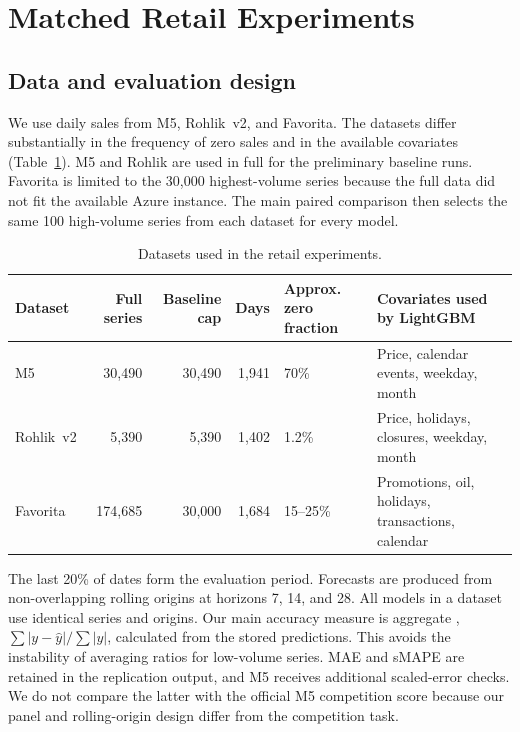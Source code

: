 \section{Matched Retail Experiments}
\label{sec:experiments}

\subsection{Data and evaluation design}
\label{sec:setup}\label{sec:experimental-setup}\label{sec:datasets}

We use daily sales from M5, Rohlik~v2, and Favorita. The datasets differ
substantially in the frequency of zero sales and in the available covariates
(Table~\ref{tab:t51}). M5 and Rohlik are used in full for the preliminary
baseline runs. Favorita is limited to the 30,000 highest-volume series because
the full data did not fit the available Azure instance. The main paired
comparison then selects the same 100 high-volume series from each dataset for
every model.

\begin{table}[htbp]
\centering
\caption{Datasets used in the retail experiments.}
\label{tab:t51}
\footnotesize
\begin{tabularx}{\textwidth}{lrrrlX}
\toprule
Dataset & Full series & Baseline cap & Days & Approx. zero fraction & Covariates used by LightGBM \\
\midrule
M5 & 30,490 & 30,490 & 1,941 & 70\% & Price, calendar events, weekday, month \\
Rohlik~v2 & 5,390 & 5,390 & 1,402 & 1.2\% & Price, holidays, closures, weekday, month \\
Favorita & 174,685 & 30,000 & 1,684 & 15--25\% & Promotions, oil, holidays, transactions, calendar \\
\bottomrule
\end{tabularx}
\end{table}

The last 20\% of dates form the evaluation period. Forecasts are produced from
non-overlapping rolling origins at horizons 7, 14, and 28. All models in a
dataset use identical series and origins. Our main accuracy measure is
aggregate \WAPE{}, $\sum |y-\hat y|/\sum |y|$, calculated from the stored
predictions. This avoids the instability of averaging ratios for low-volume
series. MAE and sMAPE are retained in the replication output, and M5 receives
additional scaled-error checks. We do not compare the latter with the official
M5 competition score because our panel and rolling-origin design differ from
the competition task.
\label{sec:evalprotocol}\label{sec:fm_metrics}\label{sec:fm-m5-metric}

